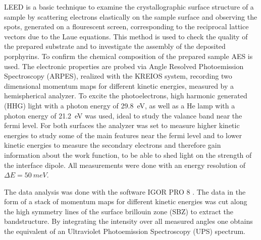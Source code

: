 LEED is a basic technique to examine the crystallographic surface structure of a sample by scattering electrons elastically on the sample surface and observing the spots, generated on a flourescent screen, corresponding to the reciprocal lattice vectors due to the Laue equations.
This method is used to check the quality of the prepared substrate and to investigate the assembly of the deposited porphyrins.
To confirm the chemical composition of the prepared sample AES is used.
The electronic properties are probed via Angle Resolved Photoemission Spectroscopy (ARPES), realized with the KREIOS system, recording two dimensional momentum maps for different kinetic energies, measured by a hemispherical analyzer.
To excite the photoelectrons, high harmonic generated (HHG) light with a photon energy of \qty{29,8}{eV}, as well as a He lamp with a photon energy of \qty{21,2}{eV} was used, ideal to study the valance band near the fermi level.
For both surfaces the analyzer was set to measure higher kinetic energies to study some of the main features near the fermi level and to lower kinetic energies to measure the secondary electrons and therefore gain information about the work function, to be able to shed light on the strength of the interface dipole.
All measurements were done with an energy resolution of $\Delta E = \qty{50}{meV}$.

The data analysis was done with the software IGOR PRO 8 \cite*{wavemetrics_igor_nodate}.
The data in the form of a stack of momentum maps for different kinetic energies was cut along the high symmetry lines of the surface brillouin zone (SBZ) to extract the bandstructure.
By integrating the intensity over all measured angles one obtains the equivalent of an Ultraviolet Photoemission Spectroscopy (UPS) spectrum.


